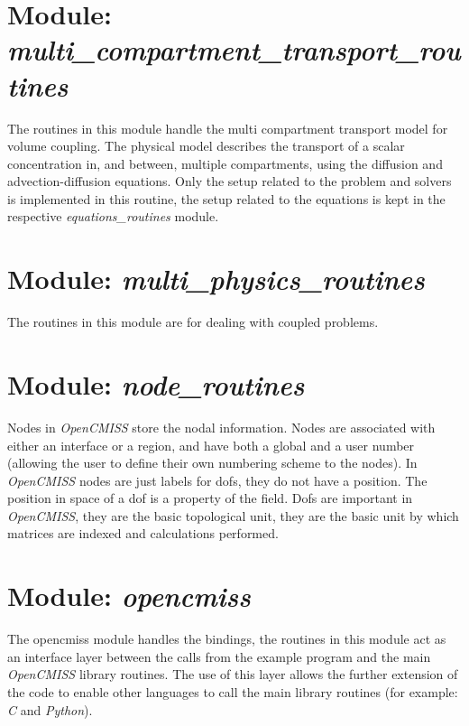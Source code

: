 \section{Module: \\ \emph{multi\_compartment\_transport\_routines}}
\label{sec:multicompartmenttransportroutines}

The routines in this module handle the multi compartment transport model for 
volume coupling. The physical model describes the transport of a scalar 
concentration in, and between, multiple compartments, using the diffusion 
and advection-diffusion equations. Only the setup related to the problem and 
solvers is implemented in this routine, the setup related to the equations 
is kept in the respective \emph{equations\_routines} module. 


\section{Module: \emph{multi\_physics\_routines}}
\label{sec:multiphysicsroutines}

The routines in this module are for dealing with coupled problems.


\section{Module: \emph{node\_routines}}
\label{sec:noderoutines}

Nodes in \emph{OpenCMISS} store the nodal information. Nodes are 
associated with either an interface or a region, and have both a global 
and a user number (allowing the user to define their own numbering scheme 
to the nodes). In \emph{OpenCMISS} nodes are just labels for dofs, they 
do not have a position. The position in space of a dof is a property of 
the field. Dofs are important in \emph{OpenCMISS}, they are the basic 
topological unit, they are the basic unit by which matrices are indexed 
and calculations performed.


\section{Module: \emph{opencmiss}}
\label{sec:opencmiss}

The opencmiss module handles the bindings, the routines in this module act as 
an interface layer between the calls from the example program and the main 
\emph{OpenCMISS} library routines. The use of this layer allows the further 
extension of the code to enable other languages to call the main library 
routines (for example: \emph{C} and \emph{Python}).


